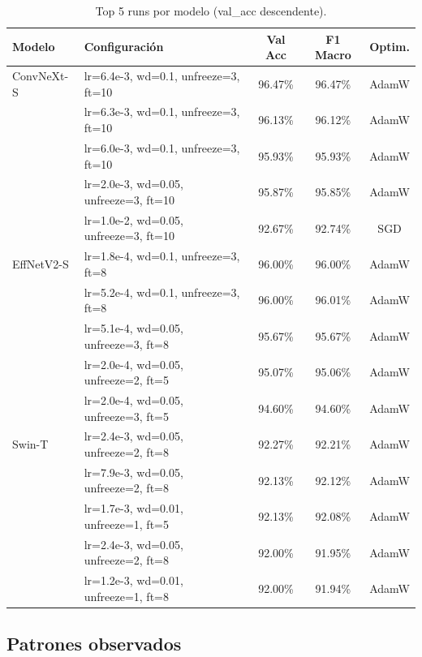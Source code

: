 \documentclass[11pt,a4paper]{article}
\begin{document}
\begin{table}[H]
    \centering
    \caption{Top 5 runs por modelo (val\_acc descendente).}
    \label{tab:top-runs}
    \begin{tabular}{llccc}
        \toprule
        Modelo & Configuración & Val Acc & F1 Macro & Optim. \\
        \midrule
        ConvNeXt-S & lr=6.4e-3, wd=0.1, unfreeze=3, ft=10 & 96.47\% & 96.47\% & AdamW \\
                   & lr=6.3e-3, wd=0.1, unfreeze=3, ft=10 & 96.13\% & 96.12\% & AdamW \\
                   & lr=6.0e-3, wd=0.1, unfreeze=3, ft=10 & 95.93\% & 95.93\% & AdamW \\
                   & lr=2.0e-3, wd=0.05, unfreeze=3, ft=10 & 95.87\% & 95.85\% & AdamW \\
                   & lr=1.0e-2, wd=0.05, unfreeze=3, ft=10 & 92.67\% & 92.74\% & SGD   \\
        \midrule
        EffNetV2-S & lr=1.8e-4, wd=0.1, unfreeze=3, ft=8  & 96.00\% & 96.00\% & AdamW \\
                   & lr=5.2e-4, wd=0.1, unfreeze=3, ft=8  & 96.00\% & 96.01\% & AdamW \\
                   & lr=5.1e-4, wd=0.05, unfreeze=3, ft=8 & 95.67\% & 95.67\% & AdamW \\
                   & lr=2.0e-4, wd=0.05, unfreeze=2, ft=5 & 95.07\% & 95.06\% & AdamW \\
                   & lr=2.0e-4, wd=0.05, unfreeze=3, ft=5 & 94.60\% & 94.60\% & AdamW \\
        \midrule
        Swin-T     & lr=2.4e-3, wd=0.05, unfreeze=2, ft=8 & 92.27\% & 92.21\% & AdamW \\
                   & lr=7.9e-3, wd=0.05, unfreeze=2, ft=8 & 92.13\% & 92.12\% & AdamW \\
                   & lr=1.7e-3, wd=0.01, unfreeze=1, ft=5 & 92.13\% & 92.08\% & AdamW \\
                   & lr=2.4e-3, wd=0.05, unfreeze=2, ft=8 & 92.00\% & 91.95\% & AdamW \\
                   & lr=1.2e-3, wd=0.01, unfreeze=1, ft=8 & 92.00\% & 91.94\% & AdamW \\
        \bottomrule
    \end{tabular}
\end{table}

\subsection{Patrones observados}
\end{document}
